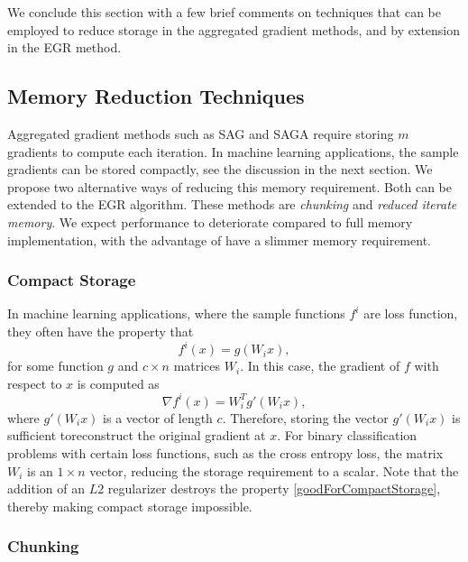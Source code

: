 \documentclass[11pt]{article}
\begin{document}
  
 We conclude this section with a few brief comments on techniques that can be employed to reduce storage in the aggregated gradient methods, and by extension in the EGR method.
  
\subsection{Memory Reduction Techniques}

 \label{memred}

   Aggregated gradient methods such as SAG and SAGA require storing $m$ gradients to compute each iteration. In machine learning applications, the sample gradients can be stored compactly, see the discussion in the next section. We propose two alternative ways of reducing this memory requirement. Both can be extended to the EGR algorithm. These methods are \emph{chunking} and \emph{reduced iterate memory}. We expect performance to deteriorate compared to full memory implementation, with the advantage of have a slimmer memory requirement.
   
   \subsubsection{Compact Storage} 
   
   In machine learning applications, where the sample functions $f^i$ are loss function, they often have the property that
	\begin{equation}
		\label{goodForCompactStorage}
		f^i(x) = g (W_i x),
	\end{equation}
	for some function $g$ and $c \times n$ matrices $W_i$. In this case, the gradient of $f$ with respect to $x$ is computed as
	\begin{equation}
		\nabla f^i(x) =  W_i^T g' ( W_i x),
	\end{equation}
	where $g' ( W_i x)$ is a vector of length $c$. Therefore, storing the vector $g' ( W_i x)$ is sufficient toreconstruct the original gradient at $x$. For binary classification problems with certain loss functions, such as the cross entropy loss, the matrix $W_i$ is an $1 \times n$ vector, reducing the storage requirement to a scalar. Note that the addition of an $L2$ regularizer destroys the property \eqref{goodForCompactStorage}, thereby making compact storage impossible. 
   \subsubsection{Chunking}
   
\end{document}
